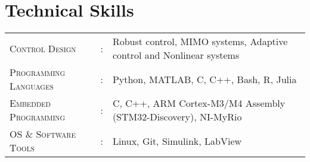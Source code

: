 \documentclass[letterpaper,10pt]{article}
\begin{document}
\section{Technical Skills}
\begin{tabular}{l c l}
\textsc{Control Design}&:& Robust control, MIMO systems, Adaptive control and Nonlinear systems\\
	\textsc{Programming Languages}&:& Python, MATLAB, C, C++, Bash, R, Julia\\
\textsc{Embedded Programming}&:& C, C++, ARM Cortex-M3/M4 Assembly
(STM32-Discovery), NI-MyRio\\
	\textsc{OS \& Software Tools}&:& Linux, Git, Simulink, LabView\\
\end{tabular}
\end{document}
